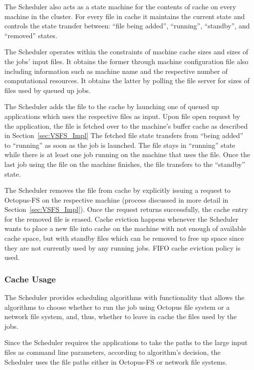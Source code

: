 The Scheduler also acts as a state machine for the contents of cache
on every machine in the cluster. For every file in cache it maintains
the current state and controls the state transfer between: ``file
being added'', ``running'', ``standby'', and ``removed'' states.

The Scheduler operates within the constraints of machine cache sizes and sizes of the jobs' input files. It obtains the former through machine configuration file also including information such as machine name and the respective number of computational resources. It obtains the latter by polling the file server for sizes of files used by queued up jobs.

The Scheduler adds the file to the cache by launching one of queued up applications which uses the respective files as input. Upon file open request by the application, the file is fetched over to the machine's buffer cache as described in Section~\ref{sec:VSFS_Impl} The fetched file state transfers from ``being added'' to ``running'' as soon as the job is launched. The file stays in ``running'' state while there is at least one job running on the machine that uses the file. Once the last job using the file on the machine finishes, the file transfers to the ``standby'' state.

The Scheduler removes the file from cache by explicitly issuing a request to Octopus-FS on the respective machine (process discussed in more detail in Section~\ref{sec:VSFS_Impl}). Once the request returns successfully, the cache entry for the removed file is erased. Cache eviction happens whenever the Scheduler wants to place a new file into cache on the machine with not enough of available cache space, but with standby files which can be removed to free up space since they are not currently used by any running jobs. FIFO cache eviction policy is used.
\subsubsection{Cache Usage}
The Scheduler provides scheduling algorithms with functionality that allows the algorithms to choose whether to run the job using Octopus file system or a network file system, and, thus, whether to leave in cache the files used by the jobs.

Since the Scheduler requires the applications to take the paths to the large input files as command line parameters, according to algorithm's decision, the Scheduler uses the file paths either in Octopus-FS or network file systems.

